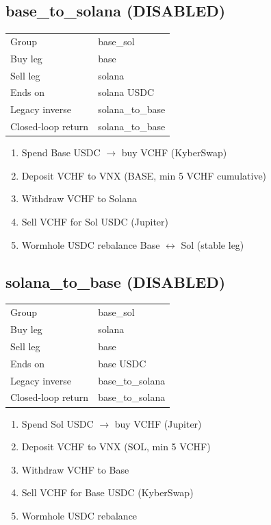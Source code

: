 \documentclass[11pt,a4paper]{article}
\begin{document}
\subsection*{\textcolor{warnred}{base\_to\_solana} (DISABLED)}
\begin{tabular}{@{}ll@{}}
Group & base\_sol \\
Buy leg & base \\
Sell leg & solana \\
Ends on & solana USDC \\
Legacy inverse & solana\_to\_base \\
Closed-loop return & solana\_to\_base \\
\end{tabular}
\begin{enumerate}[nosep,leftmargin=*]
\item Spend Base USDC $\rightarrow$ buy VCHF (KyberSwap)
\item Deposit VCHF to VNX (BASE, min 5 VCHF cumulative)
\item Withdraw VCHF to Solana
\item Sell VCHF for Sol USDC (Jupiter)
\item Wormhole USDC rebalance Base $\leftrightarrow$ Sol (stable leg)
\end{enumerate}
\subsection*{\textcolor{warnred}{solana\_to\_base} (DISABLED)}
\begin{tabular}{@{}ll@{}}
Group & base\_sol \\
Buy leg & solana \\
Sell leg & base \\
Ends on & base USDC \\
Legacy inverse & base\_to\_solana \\
Closed-loop return & base\_to\_solana \\
\end{tabular}
\begin{enumerate}[nosep,leftmargin=*]
\item Spend Sol USDC $\rightarrow$ buy VCHF (Jupiter)
\item Deposit VCHF to VNX (SOL, min 5 VCHF)
\item Withdraw VCHF to Base
\item Sell VCHF for Base USDC (KyberSwap)
\item Wormhole USDC rebalance
\end{enumerate}
\end{document}
